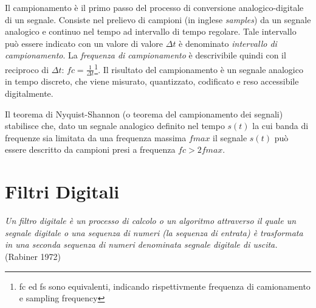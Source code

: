 Il campionamento è il primo passo del processo di conversione analogico-digitale
di un segnale. Consiste nel prelievo di campioni (in inglese \emph{samples}) da
un segnale analogico e continuo nel tempo ad intervallo di tempo regolare.
Tale intervallo può essere indicato con un valore di valore $\Delta t$ è denominato
\emph{intervallo di campionamento}. La \emph{frequenza di campionamento} è
descrivibile quindi con il reciproco di
$\Delta t$: $fc = \frac{1}{\Delta t}$\footnote{fc ed fs sono equivalenti,
indicando rispettivmente frequenza di camionamento e sampling frequency}.
Il risultato del campionamento è un segnale analogico in tempo discreto, che viene
misurato, quantizzato, codificato e reso accessibile digitalmente.

Il teorema di Nyquist-Shannon (o teorema del campionamento dei segnali) stabilisce che,
dato un segnale analogico definito nel tempo $s(t)$ la cui banda di frequenze sia limitata da una frequenza massima $fmax$
il segnale $s(t)$ può essere descritto da campioni presi a frequenza $fc > 2fmax$.

\section{Filtri Digitali}


\emph{Un filtro digitale è un processo di calcolo o un algoritmo attraverso il quale un
segnale digitale o una sequenza di numeri (la sequenza di entrata) è trasformata in
una seconda sequenza di numeri denominata segnale digitale di uscita.} (Rabiner 1972)
